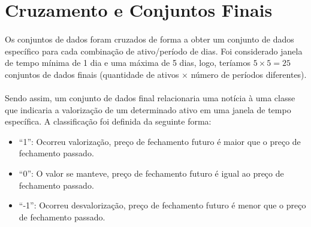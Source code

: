 \documentclass[grad,numbers]{coppe}
\begin{document}
  	\section{Cruzamento e Conjuntos Finais}\label{sec:cruzamento-e-conjuntos-finais}
  		\paragraph{}Os conjuntos de dados foram cruzados de forma a obter um conjunto de dados específico para cada combinação de ativo/período de dias. Foi considerado janela de tempo mínima de 1 dia e uma máxima de 5 dias, logo, teríamos $5\times5=25$ conjuntos de dados finais (quantidade de ativos $\times$ número de períodos diferentes).
  		\paragraph{}Sendo assim, um conjunto de dados final relacionaria uma notícia à uma classe que indicaria a valorização de um determinado ativo em uma janela de tempo específica. A classificação foi definida da seguinte forma:
 			\begin{itemize}
  			\item ``1'': Ocorreu valorização, preço de fechamento futuro é maior que o preço de fechamento passado.
	 			\item ``0'': O valor se manteve, preço de fechamento futuro é igual ao preço de fechamento passado.
	 			\item ``-1'': Ocorreu desvalorização, preço de fechamento futuro é menor que o preço de fechamento passado.
  		\end{itemize}
\end{document}
